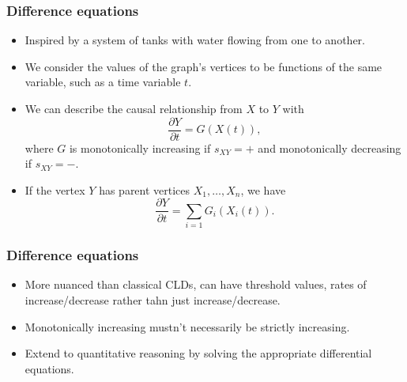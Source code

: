 \documentclass{beamer}
\begin{document}
\begin{frame}
\frametitle{Difference equations}
\begin{itemize}
\item Inspired by a system of tanks with water flowing from one to another.

\item We consider the values of the graph's vertices to be functions of the
same variable, such as a time variable $t$.

\item We can describe the causal relationship from $X$ to $Y$ with
\[\frac{\partial Y}{\partial t} = G(X(t)),\]
where $G$ is monotonically increasing if $s_{XY}=+$ and monotonically decreasing if $s_{XY}= -$.
\item If the vertex $Y$ has parent vertices $X_1,\ldots,X_n$, we have
\[\frac{\partial Y}{\partial t} = \sum_{i=1}G_i(X_i(t)).\]

\end{itemize}

\end{frame}
\begin{frame}
\frametitle{Difference equations}
\begin{itemize}
\item More nuanced than classical CLDs, can have threshold values, rates of
  increase/decrease rather tahn just increase/decrease.

\item Monotonically increasing mustn't necessarily be strictly increasing.


\item Extend to quantitative reasoning by solving the
appropriate differential equations.

\end{itemize}
\end{frame}
\end{document}
